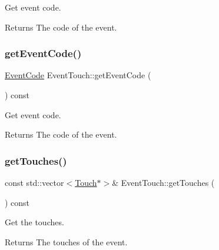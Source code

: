 Get event code.

\begin{DoxyReturn}{Returns}
The code of the event. 
\end{DoxyReturn}
\mbox{\label{classEventTouch_acd18ac36408f6789e079dde77b7c8240}} 
\subsubsection{\texorpdfstring{get\+Event\+Code()}{getEventCode()}\hspace{0.1cm}{\footnotesize\ttfamily [2/2]}}
{\footnotesize\ttfamily \hyperlink{classEventTouch_a35816ad7349f0b7accc0a30a469b0087}{Event\+Code} Event\+Touch\+::get\+Event\+Code (\begin{DoxyParamCaption}{ }\end{DoxyParamCaption}) const\hspace{0.3cm}{\ttfamily [inline]}}

Get event code.

\begin{DoxyReturn}{Returns}
The code of the event. 
\end{DoxyReturn}
\mbox{\label{classEventTouch_aa103aa7fe4e41d6abf9c08831ffac4f5}} 
\subsubsection{\texorpdfstring{get\+Touches()}{getTouches()}\hspace{0.1cm}{\footnotesize\ttfamily [1/2]}}
{\footnotesize\ttfamily const std\+::vector$<$\hyperlink{classTouch}{Touch}$\ast$$>$\& Event\+Touch\+::get\+Touches (\begin{DoxyParamCaption}{ }\end{DoxyParamCaption}) const\hspace{0.3cm}{\ttfamily [inline]}}

Get the touches.

\begin{DoxyReturn}{Returns}
The touches of the event. 
\end{DoxyReturn}
\mbox{\label{classEventTouch_aa103aa7fe4e41d6abf9c08831ffac4f5}} 
